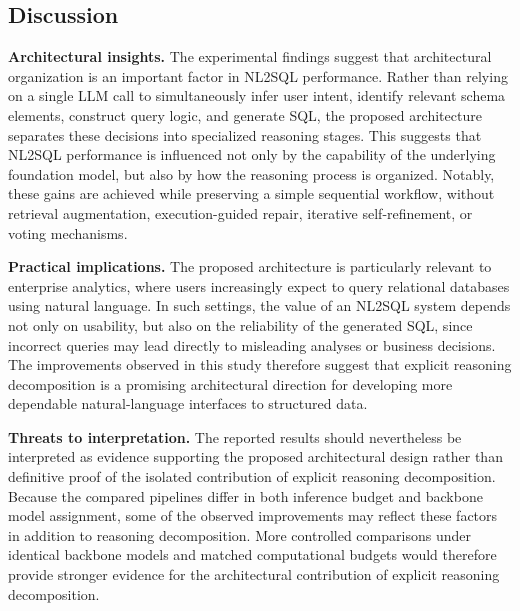 \documentclass{svproc}
\begin{document}
\subsection{Discussion}
\label{subsec:discussion}

\textbf{Architectural insights.}
The experimental findings suggest that architectural organization is an important factor in NL2SQL performance. Rather than relying on a single LLM call to simultaneously infer user intent, identify relevant schema elements, construct query logic, and generate SQL, the proposed architecture separates these decisions into specialized reasoning stages. This suggests that NL2SQL performance is influenced not only by the capability of the underlying foundation model, but also by how the reasoning process is organized. Notably, these gains are achieved while preserving a simple sequential workflow, without retrieval augmentation, execution-guided repair, iterative self-refinement, or voting mechanisms.

\textbf{Practical implications.}
The proposed architecture is particularly relevant to enterprise analytics, where users increasingly expect to query relational databases using natural language. In such settings, the value of an NL2SQL system depends not only on usability, but also on the reliability of the generated SQL, since incorrect queries may lead directly to misleading analyses or business decisions. The improvements observed in this study therefore suggest that explicit reasoning decomposition is a promising architectural direction for developing more dependable natural-language interfaces to structured data.


\textbf{Threats to interpretation.}
The reported results should nevertheless be interpreted as evidence supporting the proposed architectural design rather than definitive proof of the isolated contribution of explicit reasoning decomposition. Because the compared pipelines differ in both inference budget and backbone model assignment, some of the observed improvements may reflect these factors in addition to reasoning decomposition. More controlled comparisons under identical backbone models and matched computational budgets would therefore provide stronger evidence for the architectural contribution of explicit reasoning decomposition.






\end{document}
